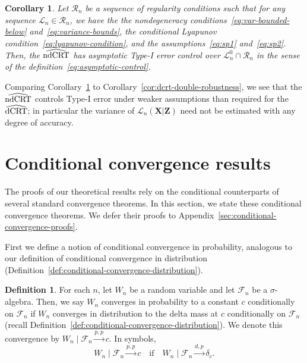 \documentclass[aos]{imsart}
\newtheorem{corollary}{Corollary}
\theoremstyle{definition}
\newtheorem{definition}{Definition}
\theoremstyle{remark}
\newcommand{\prx}{\bm X}								%
\newcommand{\prz}{\bm Z}								%
\newcommand{\law}{\mathcal L}							%
\newcommand{\nulllaws}{\mathscr L^0}					%
\newcommand{\regclass}{\mathscr R}					    %
\newcommand{\dCRThat}{\widehat{\textnormal{dCRT}}}		%
\newcommand{\ndCRThat}{\widehat{\textnormal{ndCRT}}}	%
\newcommand{\convdp}{\overset {d,p} \longrightarrow}    %
\newcommand{\convpp}{\overset {p,p} \longrightarrow}    %
\begin{document}
\begin{corollary}
\label{cor:double-robustness-ndcrt}
Let $\regclass_n$ be a sequence of regularity conditions such that for any sequence $\law_n \in \regclass_n$, we have the the nondegeneracy conditions~\eqref{eq:var-bounded-below} and~\eqref{eq:variance-bounds}, the conditional Lyapunov condition~\eqref{eq:lyapunov-condition}, and the assumptions~\eqref{eq:sp1} and~\eqref{eq:sp2}. Then, the $\ndCRThat$ has asymptotic Type-I error control over $\nulllaws_n \cap \regclass_n$ in the sense of the definition~\eqref{eq:asymptotic-control}.
\end{corollary}
Comparing Corollary~\ref{cor:double-robustness-ndcrt} to Corollary~\ref{cor:dcrt-double-robustness}, we see that the $\ndCRThat$ controls Type-I error under weaker assumptions than required for the $\dCRThat$; in particular the variance of $\law_n(\prx|\prz)$ need not be estimated with any degree of accuracy.


\section{Conditional convergence results} \label{sec:conditional-convergence-results}

The proofs of our theoretical results rely on the conditional counterparts of several standard convergence theorems. In this section, we state these conditional convergence theorems. We defer their proofs to Appendix~\ref{sec:conditional-convergence-proofs}.

First we define a notion of conditional convergence in probability, analogous to our definition of conditional convergence in distribution (Definition~\ref{def:conditional-convergence-distribution}).

\begin{definition} \label{def:conditional-convergence-probability}
	For each $n$, let $W_n$ be a random variable and let $\mathcal F_n$ be a $\sigma$-algebra. Then, we say $W_n$ converges in probability to a constant $c$ conditionally on $\mathcal F_n$ if $W_n$ converges in distribution to the delta mass at $c$ conditionally on $\mathcal F_n$ (recall Definition~\ref{def:conditional-convergence-distribution}). We denote this convergence by ${W_n \mid \mathcal F_n \convpp c}$. In symbols, 
	\begin{equation}
		W_n \mid \mathcal F_n \convpp c \quad \text{if} \quad W_n \mid \mathcal F_n \convdp \delta_c.
	\end{equation}
\end{definition}
\end{document}
